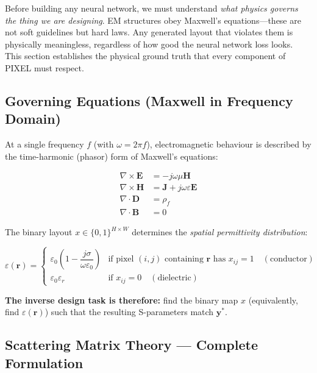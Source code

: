 \documentclass[12pt,a4paper]{article}
\newcommand{\ystar}{\mathbf{y}^{*}}
\newcommand{\HW}{H \times W}
\theoremstyle{definition}
\theoremstyle{plain}
\theoremstyle{remark}
\begin{document}
Before building any neural network, we must understand \emph{what physics governs the
thing we are designing}.
EM structures obey Maxwell's equations—these are not soft guidelines but hard laws.
Any generated layout that violates them is physically meaningless, regardless of how
good the neural network loss looks.
This section establishes the physical ground truth that every component of PIXEL must
respect.

\subsection{Governing Equations (Maxwell in Frequency Domain)}
\label{sec:maxwell}

At a single frequency $f$ (with $\omega = 2\pi f$), electromagnetic behaviour is
described by the time-harmonic (phasor) form of Maxwell's equations:

\begin{align}
  \nabla \times \mathbf{E} &= -j\omega\mu\mathbf{H} \label{eq:faraday}\\
  \nabla \times \mathbf{H} &= \mathbf{J} + j\omega\varepsilon\mathbf{E} \label{eq:ampere}\\
  \nabla \cdot \mathbf{D}  &= \rho_f \label{eq:gauss_e}\\
  \nabla \cdot \mathbf{B}  &= 0 \label{eq:gauss_m}
\end{align}

The binary layout $x \in \{0,1\}^{\HW}$ determines the \emph{spatial permittivity
distribution}:

\begin{equation}
  \varepsilon(\mathbf{r}) =
  \begin{cases}
    \varepsilon_0\!\left(1 - \dfrac{j\sigma}{\omega\varepsilon_0}\right) &
      \text{if pixel $(i,j)$ containing $\mathbf{r}$ has } x_{ij} = 1
      \quad (\text{conductor}) \\[6pt]
    \varepsilon_0 \varepsilon_r &
      \text{if } x_{ij} = 0 \quad (\text{dielectric})
  \end{cases}
  \label{eq:permittivity}
\end{equation}

\textbf{The inverse design task is therefore:} find the binary map $x$ (equivalently,
find $\varepsilon(\mathbf{r})$) such that the resulting S-parameters match $\ystar$.

\subsection{Scattering Matrix Theory — Complete Formulation}
\label{sec:smatrix}
\end{document}
